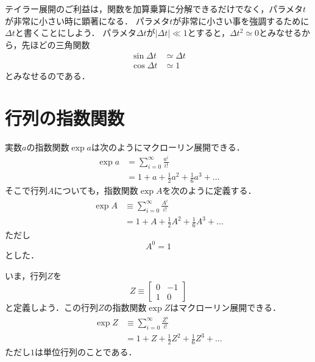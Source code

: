 \documentclass{jsbook}
\begin{document}
テイラー展開のご利益は，関数を加算乗算に分解できるだけでなく，パラメタ$t$が非常に小さい時に顕著になる．
パラメタ$t$が非常に小さい事を強調するために$\Delta t$と書くことにしよう．
パラメタ$\Delta t$が$|\Delta t|\ll1$とすると，$\Delta t^2\simeq0$とみなせるから，先ほどの三角関数
\begin{align}
\sin\Delta t&\simeq\Delta t\\
\cos\Delta t&\simeq1
\end{align}
とみなせるのである．

\section{行列の指数関数}

実数$a$の指数関数$\exp a$は次のようにマクローリン展開できる．
\begin{align}
\exp a&=\sum_{i=0}^\infty\frac{a^i}{i!}\\
&=1+a+\frac{1}{2}a^2+\frac{1}{6}a^3+\dots
\end{align}
そこで行列$A$についても，指数関数$\exp A$を次のように定義する．
\begin{align}
\exp A&\equiv\sum_{i=0}^\infty\frac{A^i}{i!}\\
&=1+A+\frac{1}{2}A^2+\frac{1}{6}A^3+\dots
\end{align}
ただし
\begin{equation}
A^0=1
\end{equation}
とした．

いま，行列$Z$を
\begin{equation}
Z\equiv\begin{bmatrix}0&-1\\1&0\end{bmatrix}
\end{equation}
と定義しよう．この行列$Z$の指数関数$\exp Z$はマクローリン展開できる．
\begin{align}
\exp Z&\equiv\sum_{i=0}^\infty\frac{Z^i}{i!}\\
&=1+Z+\frac{1}{2}Z^2+\frac{1}{6}Z^3+\dots
\end{align}
ただし$1$は単位行列のことである．
\end{document}
